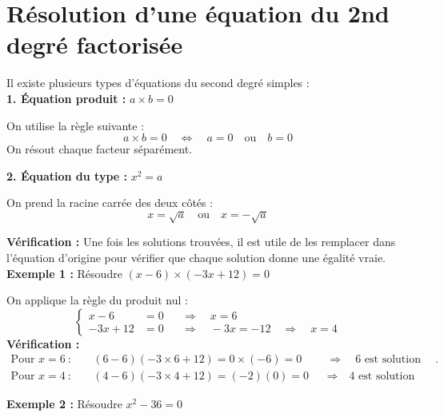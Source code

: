 \documentclass[a4paper,12pt]{article}
\begin{document}
\section*{Résolution d'une équation du 2nd degré factorisée}

\begin{tcolorbox}[colback=blue!5!white, colframe=blue!75!black, title=Méthode, breakable]
    
    Il existe plusieurs types d'équations du second degré simples : \\
    \vspace{1em}
    \textbf{1. Équation produit :} \(a \times b = 0\)
    
    On utilise la règle suivante :
    \[
    a \times b = 0 \quad \Leftrightarrow \quad a = 0 \quad \text{ou} \quad b = 0
    \]
    On résout chaque facteur séparément.
    
    \vspace{1em}
    \textbf{2. Équation du type :} $x^2 = a$
    
    On prend la racine carrée des deux côtés :
    \[
    x = \sqrt{a} \quad \text{ou} \quad x = -\sqrt{a}
    \]
    
    \vspace{1em}
    \textbf{Vérification :} Une fois les solutions trouvées, il est utile de les remplacer dans l'équation d'origine pour vérifier que chaque solution donne une égalité vraie. \\

    \textbf{Exemple 1 :} Résoudre $(x - 6) \times (-3x + 12) = 0$
    
    On applique la règle du produit nul :
\[
\left\{
\begin{aligned}
x - 6 &= 0          && \Rightarrow\quad x = 6 \\
-3x + 12 &= 0       && \Rightarrow\quad -3x = -12 \quad\Rightarrow\quad x = 4
\end{aligned}
\right.
\]
    \textbf{Vérification :}
    \begin{align*}
        \text{Pour } x = 6\ :\quad & (6 - 6)(-3 \times 6 + 12) = 0 \times (-6) = 0 &&\Rightarrow\quad \text{6 est solution de l'équation}. \\
        \text{Pour } x = 4\ :\quad & (4 - 6)(-3 \times 4 + 12) = (-2)(0) = 0 &&\Rightarrow\quad \text{4 est solution de l'équation} 
    \end{align*}
    
    \vspace{1em}
    \textbf{Exemple 2 :} Résoudre \(x^2 - 36 = 0\)
    

\end{tcolorbox}
\end{document}
